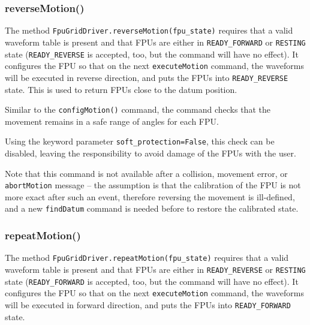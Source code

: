 \documentclass[11pt,a4paper]{report}
\begin{document}
\subsubsection{reverseMotion()}

\begin{sloppypar}
The method \texttt{FpuGridDriver.reverseMotion(fpu\_state)} requires
that a valid waveform table is present and that FPUs are either in
\texttt{READY\_FORWARD} or \texttt{RESTING} state
(\texttt{READY\_REVERSE} is accepted, too, but the command will have
no effect). It configures the FPU so that on the next
\texttt{executeMotion} command, the waveforms will be executed in
reverse direction, and puts the FPUs into \texttt{READY\_REVERSE}
state. This is used to return FPUs close to the datum position.
\end{sloppypar}

Similar to the \texttt{configMotion()} command, the command checks
that the movement remains in a safe range of angles for each
FPU.

Using the keyword parameter \texttt{soft\_protection=False}, this
check can be disabled, leaving the responsibility to avoid damage of
the FPUs with the user.


Note that this command is not available after a collision, movement
error, or \texttt{abortMotion} message -- the assumption is that the
calibration of the FPU is not more exact after such an event,
therefore reversing the movement is ill-defined, and a new
\texttt{findDatum} command is needed before to restore the calibrated
state.


\subsubsection{repeatMotion()}

\begin{sloppypar}
The method \texttt{FpuGridDriver.repeatMotion(fpu\_state)} requires
that a valid waveform table is present and that FPUs are either in
\texttt{READY\_REVERSE} or \texttt{RESTING} state
(\texttt{READY\_FORWARD} is accepted, too, but the command will have
no effect). It configures the FPU so that on the next
\texttt{executeMotion} command, the waveforms will be executed in
forward direction, and puts the FPUs into \texttt{READY\_FORWARD}
state. 
\end{sloppypar}
\end{document}
